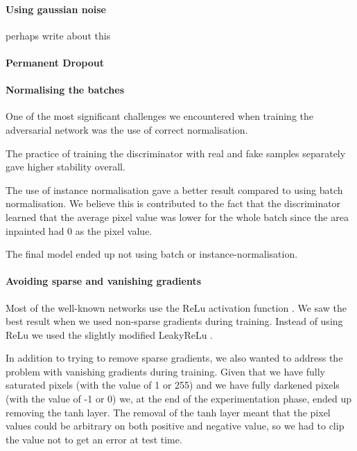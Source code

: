\paragraph{Using gaussian noise}
perhaps write about this

\paragraph{Permanent Dropout}

\paragraph{Normalising the batches}
One of the most significant challenges we encountered when training the adversarial network was the use of correct normalisation. 

The practice of training the discriminator with real and fake samples separately gave higher stability overall. 

The use of instance normalisation gave a better result compared to using batch normalisation. We believe this is contributed to the fact that the discriminator learned that the average pixel value was lower for the whole batch since the area inpainted had 0 as the pixel value.

The final model ended up not using batch or instance-normalisation. 



\paragraph{Avoiding sparse and vanishing gradients}
Most of the well-known networks use the ReLu\cite{Nair/2010/RLU/3104322.3104425} activation function \cite{DBLP:journals/corr/SimonyanZ14a} \cite{DBLP:journals/corr/SzegedyIV16} 
\cite{DBLP:journals/corr/HeZRS15}.
We saw the best result when we used non-sparse gradients during training. 
Instead of using ReLu we used the slightly modified LeakyReLu \cite{Maas2013RectifierNI}.


In addition to trying to remove sparse gradients, we also wanted to address the problem with vanishing gradients during training. Given that we have fully saturated pixels (with the value of 1 or 255) and we have fully darkened pixels (with the value of -1 or 0) we, at the end of the experimentation phase, ended up removing the tanh layer. 
The removal of the tanh layer meant that the pixel values could be arbitrary on both positive and negative value, so we had to clip the value not to get an error at test time. 



